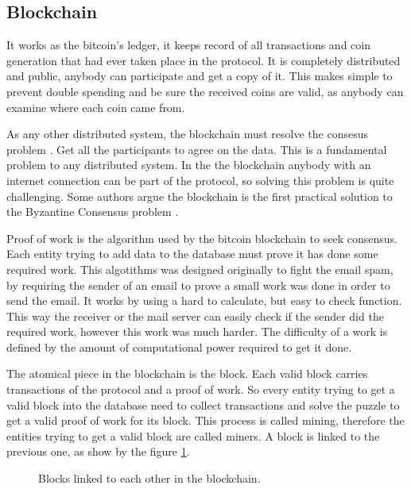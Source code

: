 \subsection{Blockchain} \label{subsec:Blockchain}
It works as the bitcoin's ledger, it keeps record of all
  transactions and coin generation that had ever taken place in the protocol.
It is completely distributed and public, anybody can participate and get a
  copy of it.
This makes simple to prevent double spending and be sure the received coins are
  valid, as anybody can examine where each coin came from.

As any other distributed system, the blockchain must resolve the consesus
  problem \cite{fischer1983consensus}. Get all the participants to agree on
  the data. This is a fundamental problem to any distributed system. In the
  the blockchain anybody with an internet connection can be part of the
  protocol, so solving this problem is quite challenging. Some authors argue
  the blockchain is the first practical solution to the Byzantine Consensus
  problem \cite{miller2014anonymous} \cite{sun2014solving}.

Proof of work is the algorithm used by the bitcoin blockchain to seek
  consensus. Each entity trying to add data to the database must prove it
  has done some required work. This algotithms was designed originally to
  fight the email spam, by requiring the sender of an email to prove a small
  work was done in order to send the email\cite{dwork1992pricing}.
It works by using a hard to calculate, but easy to check function. This
  way the receiver or the mail server can easily check if the sender did
  the required work, however this work was much harder. The difficulty of
  a work is defined by the amount of computational power required to get
  it done.

The atomical piece in the blockchain is the block. Each valid block carries
  transactions of the protocol and a proof of work. So every entity trying to
  get a valid block into the database need to collect transactions and solve
  the puzzle to get a valid proof of work for its block.
This process is called mining, therefore the entities trying to get a valid
  block are called miners. A block is linked to the previous one, as show by the
  figure \ref{fig:block_links}.

\begin{figure}
	\centering
	\def\svgwidth{\columnwidth}
	
	\caption{Blocks linked to each other in the blockchain.}
	\label{fig:block_links}
\end{figure}

